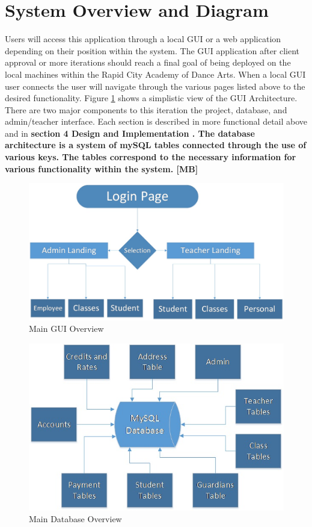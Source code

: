 \section{System Overview and Diagram}
\textmd{Users will access this application through a local GUI or a web application depending on their position within the system. The GUI application after client approval or more iterations should reach a final goal of being deployed on the local machines within the Rapid City Academy of Dance Arts. 
When a local GUI user connects the user will navigate through the various pages listed above to the desired functionality. Figure \ref{fig:GUI Overview} shows a simplistic view of the GUI Architecture.
There are two major components to this iteration the project, database, and admin/teacher interface.  Each section is described in more functional detail above and in} \bf section 4 Design and Implementation \rm.
The database architecture is a system of mySQL tables connected through the use of various keys. The tables correspond to the necessary information for various functionality within the system. [MB]


\begin{figure}
  \includegraphics[width=\linewidth]{GUI.jpg}
  \caption{Main GUI Overview}
  \label{fig:GUI Overview}
\end{figure}

\begin{figure}
  \includegraphics[width=\linewidth]{DatabaseDiagram.jpg}
  \caption{Main Database Overview}
  \label{fig:Database Overview}
\end{figure}


